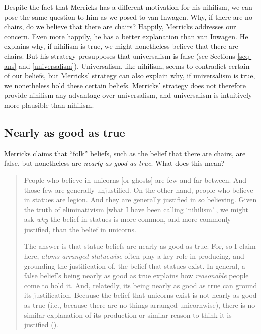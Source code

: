 \documentclass[12pt,twoside]{reedfancy}
\begin{document}
\begin{spacing}{1.25}
Despite the fact that Merricks has a different motivation for his
nihilism, we can pose the same question to him as we posed to van
Inwagen.  Why, if there are no chairs, do we believe that there are
chairs?  Happily, Merricks addresses our concern.  Even more happily,
he has a better explanation than van Inwagen.  He explains why, if
nihilism is true, we might nonetheless believe that there are chairs.
But his strategy presupposes that universalism is false (see Sections
\ref{scq-ans} and \ref{universalism}).  Universalism, like nihilism,
seems to contradict certain of our beliefs, but Merricks' strategy can
also explain why, if universalism is true, we nonetheless hold these
certain beliefs.  Merricks' strategy does not therefore provide
nihilism any advantage over universalism, and universalism is
intuitively more plausible than nihilism.

\subsection{Nearly as good as true}
\label{near}
Merricks claims that ``folk'' beliefs, such as the belief that there
are chairs, are false, but nonetheless are {\em nearly as good as
  true}.  What does this mean?

\begin{quote}
People who believe in unicorns [or ghosts] are few and far between.
And those few are generally unjustified.  On the other hand, people
who believe in statues are legion.  And they are generally justified
in so believing.  Given the truth of eliminativism [what I have been
  calling `nihilism'], we might ask {\em why} the belief in statues is
more common, and more commonly justified, than the belief in unicorns.

The answer is that statue beliefs are nearly as good as true.  For, so
I claim here, {\em atoms arranged statuewise} often play a key role in
producing, and grounding the justification of, the belief that statues
exist.  In general, a false belief's being nearly as good as true
explains how {\em reasonable} people come to hold it.  And, relatedly,
its being nearly as good as true can ground its justification.
Because the belief that unicorns exist is not nearly as good as true
(i.e., because there are no things arranged unicornwise), there is no
similar explanation of its production or similar reason to think it is
justified (\citeyear[171--172]{merricks2001a}).
\end{quote}


\end{spacing}
\end{document}
